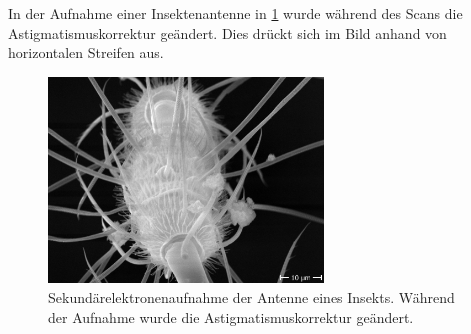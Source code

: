 In der Aufnahme einer Insektenantenne in \cref{fig:astigmatenne} wurde während des Scans die Astigmatismuskorrektur geändert.
Dies drückt sich im Bild anhand von horizontalen Streifen aus.

\begin{figure}[!ht]
    \centering
    \includegraphics[width=0.65\textwidth]{img/SEM/10.9.20 11_09_41_Mag_ 1800x_astigmatism_introduced}
    \caption{Sekundärelektronenaufnahme der Antenne eines Insekts. Während der Aufnahme wurde die Astigmatismuskorrektur geändert.}
    \label{fig:astigmatenne}
\end{figure}
